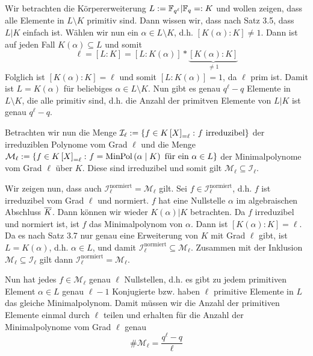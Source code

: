 \begin{exercisePage}
	Wir betrachten die Körpererweiterung $L\mathrel{:=} \mathbb{F}_{q^\ell} | \mathbb{F}_q \mathrel{=:} K$ und wollen zeigen, dass alle Elemente in $L \setminus K$ primitiv sind. Dann wissen wir, dass nach Satz 3.5, dass $L | K$ einfach ist. Wählen wir nun ein $\alpha \in L \setminus K$, d.h. $[K(\alpha) : K] \neq 1$. Dann ist auf jeden Fall $K(\alpha) \subseteq L$ und somit
	\begin{equation*}
		\ell = [L : K] = [L : K(\alpha)] * \underbrace{[K(\alpha) : K]}_{\neq 1}
	\end{equation*}
	Folglich ist $[K(\alpha) : K] = \ell$ und somit $[L : K(\alpha)] = 1$, da $\ell$ prim ist. Damit ist $L = K(\alpha)$ für beliebiges $\alpha \in L \setminus K$. Nun gibt es genau $q^\ell - q$ Elemente in $L \setminus K$, die alle primitiv sind, d.h. die Anzahl der primitven Elemente von $L|K$ ist genau $q^\ell - q$.
	
	Betrachten wir nun die Menge $\mathcal{I}_\ell \defeq \menge{f \in \polynom[K][X]_{= \ell} \colon f \text{ irreduzibel}}$ der irreduziblen Polynome vom Grad $\ell$ und die Menge $\mathcal{M}_\ell \defeq \menge{f \in \polynom[K][X]_{= \ell} \colon f = \MinPol{\alpha}{K} \text{ für ein } \alpha \in L}$ der Minimalpolynome vom Grad $\ell$ über $K$. Diese sind irreduzibel und somit gilt $\mathcal{M}_\ell \subseteq \mathcal{I}_\ell$. 
	
	Wir zeigen nun, dass auch $\mathcal{I}_\ell^{\text{normiert}} = \mathcal{M}_\ell$ gilt. Sei $f \in \mathcal{I}_\ell^{\text{normiert}}$, d.h. $f$ ist irreduzibel vom Grad $\ell$ und normiert. $f$ hat eine Nullstelle $\alpha$ im algebraischen Abschluss $\overline{K}$. Dann können wir wieder $K(\alpha) | K$ betrachten. Da $f$ irreduzibel und normiert ist, ist $f$ das Minimalpolynom von $\alpha$. Dann ist $[K(\alpha) : K] = \ell$. Da es nach Satz 3.7 nur genau eine Erweiterung von $K$ mit Grad $\ell$ gibt, ist $L = K(\alpha)$, d.h. $\alpha \in L$, und damit $\mathcal{I}_\ell^{\text{normiert}} \subseteq \mathcal{M}_\ell$. Zusammen mit der Inklusion $\mathcal{M}_\ell \subseteq \mathcal{I}_\ell$ gilt dann $\mathcal{I}_\ell^{\text{normiert}} = \mathcal{M}_\ell$.
	
	Nun hat jedes $f \in \mathcal{M}_\ell$ genau $\ell$ Nullstellen, d.h. es gibt zu jedem primitiven Element $\alpha \in L$ genau $\ell - 1$ Konjugierte bzw. haben $\ell$ primitive Elemente in $L$ das gleiche Minimalpolynom. Damit müssen wir die Anzahl der primitiven Elemente einmal durch $\ell$ teilen und erhalten für die Anzahl der Minimalpolynome vom Grad $\ell$ genau
	\begin{equation*}
		\# \mathcal{M}_{\ell} = \frac{q^\ell - q}{\ell}
	\end{equation*}
	

\end{exercisePage}
